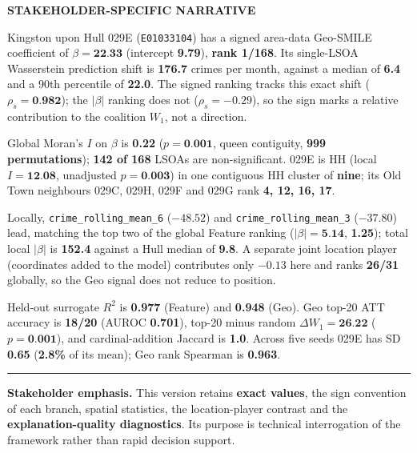 \begin{tcolorbox}
\begin{minipage}[t]{0.55\linewidth}
{\scriptsize\bfseries STAKEHOLDER-SPECIFIC NARRATIVE}

\vspace{0.8mm}

\footnotesize
\RaggedRight

Kingston upon Hull 029E (\texttt{E01033104}) has a signed area-data
Geo-SMILE coefficient of $\beta=\textbf{22.33}$ (intercept \textbf{9.79}),
\textbf{rank 1/168}. Its single-LSOA Wasserstein prediction shift is
\textbf{176.7} crimes per month, against a median of \textbf{6.4} and a 90th
percentile of \textbf{22.0}. The signed ranking tracks this exact shift
($\rho_s=\textbf{0.982}$); the $|\beta|$ ranking does not
($\rho_s=\textbf{$-0.29$}$), so the sign marks a relative contribution to the
coalition $W_1$, not a direction.

\vspace{1.2mm}

Global Moran's $I$ on $\beta$ is \textbf{0.22} ($p=\textbf{0.001}$, queen
contiguity, \textbf{999 permutations}); \textbf{142 of 168} LSOAs are
non-significant. 029E is HH (local $I=\textbf{12.08}$, unadjusted
$p=\textbf{0.003}$) in one contiguous HH cluster of \textbf{nine}; its Old
Town neighbours 029C, 029H, 029F and 029G rank \textbf{4, 12, 16, 17}.

\vspace{1.2mm}

Locally, \texttt{crime\_rolling\_mean\_6} (\textbf{$-48.52$}) and
\texttt{crime\_rolling\_mean\_3} (\textbf{$-37.80$}) lead, matching the top
two of the global Feature ranking ($|\beta|=\textbf{5.14}$, \textbf{1.25});
total local $|\beta|$ is \textbf{152.4} against a Hull median of
\textbf{9.8}. A separate joint location player (coordinates added to the
model) contributes only \textbf{$-0.13$} here and ranks \textbf{26/31}
globally, so the Geo signal does not reduce to position.

\vspace{1.2mm}

Held-out surrogate $R^2$ is \textbf{0.977} (Feature) and \textbf{0.948}
(Geo). Geo top-20 ATT accuracy is \textbf{18/20} (AUROC \textbf{0.701}),
top-20 minus random $\Delta W_1=\textbf{26.22}$ ($p=\textbf{0.001}$), and
cardinal-addition Jaccard is \textbf{1.0}. Across five seeds 029E has SD
\textbf{0.65} (\textbf{2.8\%} of its mean); Geo rank Spearman is
\textbf{0.963}.

\end{minipage}

\vspace{2mm}
\hrule
\vspace{1mm}

{\scriptsize
\textbf{Stakeholder emphasis.}
This version retains \textbf{exact values}, the sign convention of each
branch, spatial statistics, the location-player contrast and the
\textbf{explanation-quality diagnostics}. Its purpose is technical
interrogation of the framework rather than rapid decision support.
}

\end{tcolorbox}


